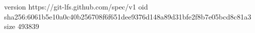 version https://git-lfs.github.com/spec/v1
oid sha256:6061b5e10a0c40b256708f6f651dee9376d148a89d31bfe2f8b7e05bcd8c81a3
size 493839
